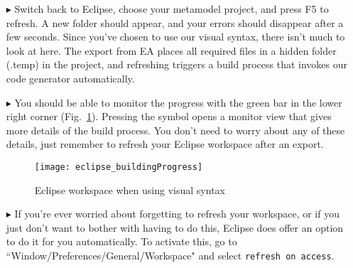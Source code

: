 \begin{itemize}
\item[$\blacktriangleright$] Switch back to Eclipse, choose your metamodel project, and press F5 to refresh. A new folder should appear, and your errors should
disappear after a few seconds. Since you've chosen to use our visual syntax, there isn't much to look at here. The export from EA places all required files in a
hidden folder (.temp) in the project, and refreshing triggers a build process that invokes our code generator automatically. 

\item[$\blacktriangleright$] You should be able to monitor the progress with the green bar in the lower right corner (Fig.~\ref{fig_eclipseBuild}). Pressing the
symbol opens a monitor view that gives more details of the build process. You don't need to worry about any of these details, just remember to refresh your
Eclipse workspace after an export.


\vspace{0.5cm}

\begin{figure}[htbp]
	\centering
  \texttt{[image: eclipse\_buildingProgress]}
	\caption{Eclipse workspace when using visual syntax} 
	\label{fig_eclipseBuild} 
\end{figure}

\vspace{0.5cm}

\item[$\blacktriangleright$] If you're ever worried about forgetting to refresh your workspace, or if you just don't want to bother with having to do this,
Eclipse does offer an option to do it for you automatically. To activate this, go to ``Window/Preferences/General/Workspace" and select \texttt{refresh on
access}.

\end{itemize}